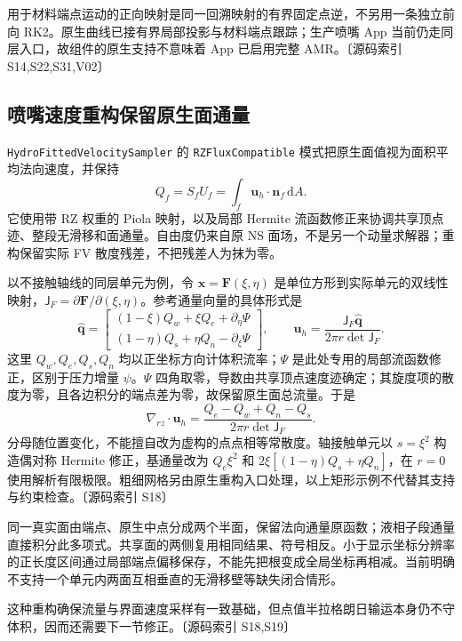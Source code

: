 \documentclass[UTF8,a4paper,11pt,fontset=fandol]{ctexart}
\newcommand{\code}[1]{\nolinkurl{#1}}
\newcommand{\src}[1]{\textcolor{ink}{\small〔源码索引 #1〕}}
\newcommand{\vel}{\bm{u}}
\newcommand{\dd}{\,\mathrm{d}}
\newcommand{\mat}[1]{\mathsf{#1}}
\begin{document}
用于材料端点运动的正向映射是同一回溯映射的有界固定点逆，不另用一条独立前向 RK2。原生曲线已接有界局部投影与材料端点跟踪；生产喷嘴 App 当前仍走同层入口，故组件的原生支持不意味着 App 已启用完整 AMR。\src{S14,S22,S31,V02}

\subsection{喷嘴速度重构保留原生面通量}
\code{HydroFittedVelocitySampler} 的 \code{RZFluxCompatible} 模式把原生面值视为面积平均法向速度，并保持
\begin{equation}
 Q_f=S_fU_f=\int_f\vel_h\cdot\bm n_f\dd A.
\end{equation}
它使用带 RZ 权重的 Piola 映射，以及局部 Hermite 流函数修正来协调共享顶点迹、整段无滑移和面通量。自由度仍来自原 NS 面场，不是另一个动量求解器；重构保留实际 FV 散度残差，不把残差人为抹为零。

以不接触轴线的同层单元为例，令 $\bm x=\bm F(\xi,\eta)$ 是单位方形到实际单元的双线性映射，$\mat J_F=\partial\bm F/\partial(\xi,\eta)$。参考通量向量的具体形式是
\begin{equation}
 \widehat{\bm q}=\begin{bmatrix}(1-\xi)Q_w+\xi Q_e+\partial_\eta\Psi\\
 (1-\eta)Q_s+\eta Q_n-\partial_\xi\Psi\end{bmatrix},\qquad
 \vel_h=\frac{\mat J_F\widehat{\bm q}}{2\pi r\det\mat J_F}.
\end{equation}
这里 $Q_w,Q_e,Q_s,Q_n$ 均以正坐标方向计体积流率；$\Psi$ 是此处专用的局部流函数修正，区别于压力增量 $\psi$。$\Psi$ 四角取零，导数由共享顶点速度迹确定；其旋度项的散度为零，且各边积分的端点差为零，故保留原生面总流量。于是
\begin{equation}
 \nabla_{rz}\cdot\vel_h=
 \frac{Q_e-Q_w+Q_n-Q_s}{2\pi r\det\mat J_F}.
\end{equation}
分母随位置变化，不能擅自改为虚构的点点相等常散度。轴接触单元以 $s=\xi^2$ 构造偶对称 Hermite 修正，基通量改为 $Q_e\xi^2$ 和 $2\xi[(1-\eta)Q_s+\eta Q_n]$，在 $r=0$ 使用解析有限极限。粗细网格另由原生重构入口处理，以上矩形示例不代替其支持与约束检查。\src{S18}

同一真实面由端点、原生中点分成两个半面，保留法向通量原函数；液相子段通量直接积分此多项式。共享面的两侧复用相同结果、符号相反。小于显示坐标分辨率的正长度区间通过局部端点偏移保存，不能先把根变成全局坐标再相减。当前明确不支持一个单元内两面互相垂直的无滑移壁等缺失闭合情形。

这种重构确保流量与界面速度采样有一致基础，但点值半拉格朗日输运本身仍不守体积，因而还需要下一节修正。\src{S18,S19}
\end{document}
